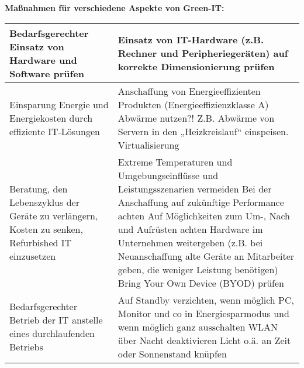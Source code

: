 \documentclass[asp1.tex]{subfiles}
\begin{document}
\break

\textbf{Maßnahmen für verschiedene Aspekte von Green-IT:}
\begin{table}[H]
    \centering
    \begin{tabular}{|p{}|p{}|}

        \hline

        Bedarfsgerechter Einsatz von Hardware und Software prüfen                                         & Einsatz von IT-Hardware (z.B. Rechner und Peripheriegeräten) auf korrekte Dimensionierung prüfen

        \\\hline

        Einsparung Energie und Energiekosten durch effiziente IT-Lösungen                                 & Anschaffung von Energieeffizienten Produkten (Energieeffizienzklasse A)
        \newline Abwärme nutzen?! Z.B. Abwärme von Servern in den „Heizkreislauf“ einspeisen.
        \newline Virtualisierung

        \\\hline

        Beratung, den Lebenszyklus der Geräte zu verlängern, Kosten zu senken, Refurbished IT einzusetzen & Extreme Temperaturen und Umgebungseinflüsse und Leistungsszenarien vermeiden
        \newline Bei der Anschaffung auf zukünftige Performance achten
        \newline Auf Möglichkeiten zum Um-, Nach und Aufrüsten achten
        \newline Hardware im Unternehmen weitergeben (z.B. bei Neuanschaffung alte Geräte an Mitarbeiter geben, die weniger Leistung benötigen)
        \newline Bring Your Own Device (BYOD) prüfen

        \\\hline

        Bedarfsgerechter Betrieb der IT anstelle eines durchlaufenden Betriebs                            & Auf Standby verzichten, wenn möglich
        \newline PC, Monitor und co in Energiesparmodus und wenn möglich ganz ausschalten
        \newline WLAN über Nacht deaktivieren
        \newline Licht o.ä. an Zeit oder Sonnenstand knüpfen

        \\\hline


\end{tabular}
\end{table}
\end{document}
